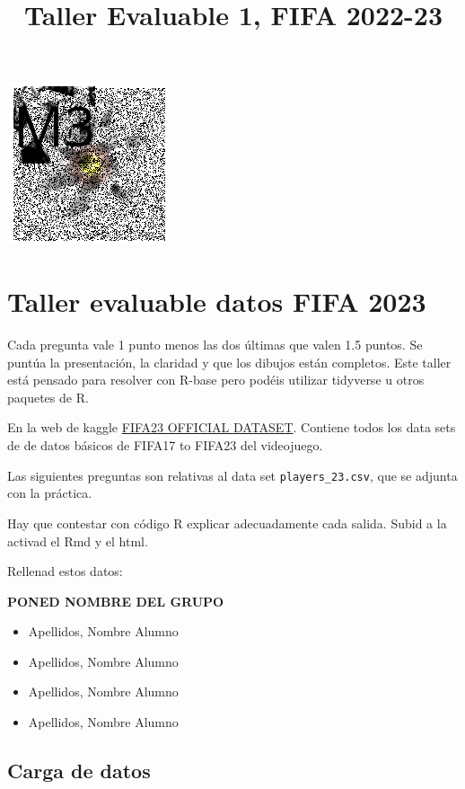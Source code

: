 \documentclass[
]{article}
\title{Taller Evaluable 1, FIFA 2022-23}
\author{}
\date{\vspace{-2.5em}}
\providecommand{\tightlist}{%
  \setlength{\itemsep}{0pt}\setlength{\parskip}{0pt}}
\begin{document}
\maketitle

\begin{center}\includegraphics[width=0.1\linewidth]{logoM3} \end{center}

\hypertarget{taller-evaluable-datos-fifa-2023}{%
\section{Taller evaluable datos FIFA
2023}\label{taller-evaluable-datos-fifa-2023}}

Cada pregunta vale 1 punto menos las dos últimas que valen 1.5 puntos.
Se puntúa la presentación, la claridad y que los dibujos están
completos. Este taller está pensado para resolver con R-base pero podéis
utilizar tidyverse u otros paquetes de R.

En la web de kaggle
\href{https://www.kaggle.com/datasets/bryanb/fifa-player-stats-database}{FIFA23
OFFICIAL DATASET}. Contiene todos los data sets de de datos básicos de
FIFA17 to FIFA23 del videojuego.

Las siguientes preguntas son relativas al data set
\texttt{players\_23.csv}, que se adjunta con la práctica.

Hay que contestar con código R explicar adecuadamente cada salida. Subid
a la activad el Rmd y el html.

Rellenad estos datos:

\textbf{PONED NOMBRE DEL GRUPO}

\begin{itemize}
\tightlist
\item
  Apellidos, Nombre Alumno
\item
  Apellidos, Nombre Alumno
\item
  Apellidos, Nombre Alumno
\item
  Apellidos, Nombre Alumno
\end{itemize}

\hypertarget{carga-de-datos}{%
\subsection{Carga de datos}\label{carga-de-datos}}
\end{document}
